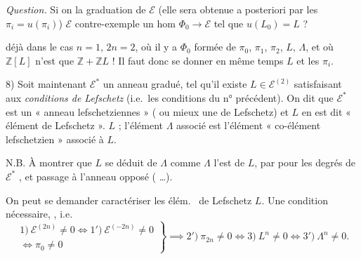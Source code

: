 \documentclass[11pt,a4paper]{article}
\begin{document}

\emph{Question.} Si on  la graduation de $\mathcal{E}$ (elle
sera obtenue a posteriori par les $\pi_{i} = u(\pi_{i})$) $\mathcal{E}$
\ill{}  \ill{} \ill{} contre-exemple \ill{} un hom
$\Phi_{0} \to \mathcal{E}$ tel que $u(L_{0}) = L$ ?


déjà dans le cas $n = 1$, $2n = 2$, où il y a  $\Phi_{0}$ formée de
$\pi_{0}$, $\pi_{1}$, $\pi_{2}$, $L$, $\Lambda$, et où $\mathbb{Z}[L]$ n'est que
$\mathbb{Z} + \mathbb{Z}L$ ! Il faut donc se donner en même temps $L$ et les
$\pi_{i}$.


8) Soit maintenant $\mathcal{E}^{*}$ un anneau gradué,
 tel qu'il existe $L \in \mathcal{E}^{(2)}$ satisfaisant aux
\emph{conditions de Lefschetz} (i.e.\ les conditions du n° précédent). On dit
que $\mathcal{E}^{*}$ est un « anneau   lefschetziennes » \struck{(\ill{})} (\ill{} ou mieux \ill{}
une  de Lefschetz) et $L$ en est dit « élément de
Lefschetz ». \struck{\ill{}} $L$ ; l'élément $\Lambda$ associé est
\struck{\ill{}} l'élément \struck{\ill{}} « co-élément lefschetzien » associé
à $L$.


N.B. À montrer que $L$ se déduit de $\Lambda$ comme $\Lambda$ l'est de $L$,
par  \add{\ill{}} pour les degrés de $\mathcal{E}^{*}$
\ill{}, et passage à l'anneau opposé (
\ldots).


On peut se demander  caractériser les élém.\ \struck{\ill{}} de Lefschetz
$L$. Une condition nécessaire, \ill{}, i.e.
\[ \left. \begin{array}{l} 1)\ \mathcal{E}^{(2n)} \neq 0 \iff 1')\ \mathcal{E}^{(-2n)} \neq 0 \\ \iff \pi_{0} \neq 0 \end{array} \right\} \implies 2')\ \pi_{2n} \neq 0 \iff 3)\ L^{n} \neq 0 \iff 3')\ \Lambda^{n} \neq 0 . \]
\end{document}
